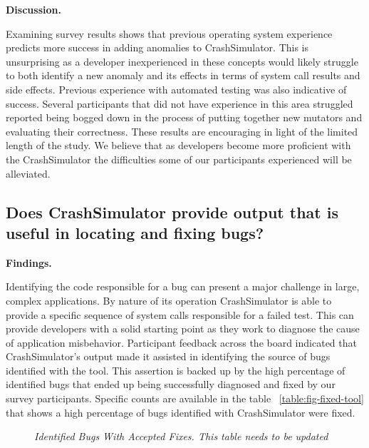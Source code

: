 {\bf Discussion. }

Examining survey results
shows that previous operating system experience predicts more success in
adding anomalies to CrashSimulator.  This is unsurprising as a developer
inexperienced in these concepts would likely struggle to both identify
a new anomaly and its effects in terms of system call results and side
effects.
Previous experience with automated testing was also indicative of success.
Several participants that did not have experience in this area struggled
reported being bogged down in the process of putting together new mutators
and evaluating their correctness.  These results are encouraging in light
of the limited length of the study.  We believe that as developers become
more proficient with the CrashSimulator the difficulties some of our
participants experienced will be alleviated.


\subsection{Does CrashSimulator provide output that is useful in locating
and fixing bugs?}


{\bf Findings. }

Identifying the code responsible for a bug can present a major challenge in
large, complex applications.  By nature of its operation CrashSimulator is
able to provide a specific sequence of system calls responsible for a
failed test.  This can provide developers with a solid starting point as
they work to diagnose the cause of application misbehavior.
Participant feedback across the board indicated that CrashSimulator's
output made it assisted in identifying the source of bugs identified with
the tool.  This assertion is backed up by the high percentage of identified
bugs that ended up being successfully diagnosed and fixed by our survey
participants.  Specific counts are available in the table
~\ref{table:fig-fixed-tool} that
shows a high percentage of bugs identified with
CrashSimulator were fixed.


\begin{figure}[t]
  \center{}
  \caption{\emph{Identified Bugs With Accepted Fixes.  This table needs
  to be updated}}
  \label{fig-fixed-tool}
\end{figure}


